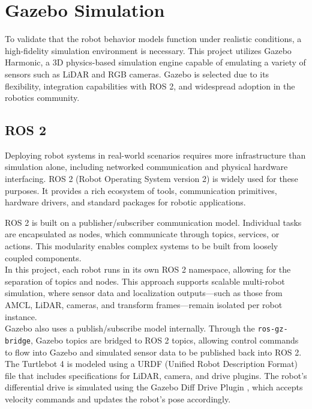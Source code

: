 \section{Gazebo Simulation}
To validate that the robot behavior models function under realistic conditions, a high-fidelity simulation environment is necessary. This project utilizes Gazebo Harmonic, a 3D physics-based simulation engine capable of emulating a variety of sensors such as LiDAR and RGB cameras. Gazebo is selected due to its flexibility, integration capabilities with ROS 2, and widespread adoption in the robotics community.

\subsection{ROS 2}
\label{sub:ros_2}
Deploying robot systems in real-world scenarios requires more infrastructure than simulation alone, including networked communication and physical hardware interfacing. ROS 2 (Robot Operating System version 2) is widely used for these purposes. It provides a rich ecosystem of tools, communication primitives, hardware drivers, and standard packages for robotic applications.

ROS 2 is built on a publisher/subscriber communication model. Individual tasks are encapsulated as nodes, which communicate through topics, services, or actions. This modularity enables complex systems to be built from loosely coupled components.\\

In this project, each robot runs in its own ROS 2 namespace, allowing for the separation of topics and nodes. This approach supports scalable multi-robot simulation, where sensor data and localization outputs—such as those from AMCL, LiDAR, cameras, and transform frames—remain isolated per robot instance.\\

Gazebo also uses a publish/subscribe model internally. Through the \texttt{ros-gz-bridge}, Gazebo topics are bridged to ROS 2 topics, allowing control commands to flow into Gazebo and simulated sensor data to be published back into ROS 2.\\

The Turtlebot 4 is modeled using a URDF (Unified Robot Description Format) file that includes specifications for LiDAR, camera, and drive plugins. The robot’s differential drive is simulated using the Gazebo Diff Drive Plugin \cite{gz-diff-drive}, which accepts velocity commands and updates the robot's pose accordingly.

